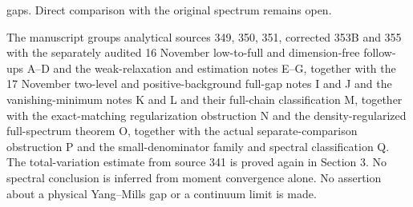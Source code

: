\documentclass[11pt]{article}
\begin{document}
gaps. Direct comparison with the original spectrum remains open.

The manuscript groups analytical sources 349, 350, 351, corrected 353B and 355 with the separately audited 16 November low-to-full and dimension-free follow-ups A--D and the weak-relaxation and estimation notes E--G, together with the 17 November two-level and positive-background full-gap notes I and J and the vanishing-minimum notes K and L and their full-chain classification M, together with the exact-matching regularization obstruction N and the density-regularized full-spectrum theorem O, together with the actual separate-comparison obstruction P and the small-denominator family and spectral classification Q. The total-variation estimate from source 341 is proved again in Section 3. No spectral conclusion is inferred from moment convergence alone. No assertion about a physical Yang--Mills gap or a continuum limit is made.
\end{document}
